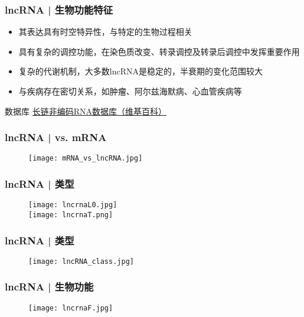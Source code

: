 \begin{frame}
  \frametitle{lncRNA | 生物功能特征}
  \begin{itemize}
    \item 其表达具有时空特异性，与特定的生物过程相关
    \item 具有复杂的调控功能，在染色质改变、转录调控及转录后调控中发挥重要作用
    \item 复杂的代谢机制，大多数lncRNA是稳定的，半衰期的变化范围较大
    \item 与疾病存在密切关系，如肿瘤、阿尔兹海默病、心血管疾病等
  \end{itemize}
  \pause
  \begin{block}{数据库}
    \href{http://zh.wikipedia.org/wiki/\%E9\%95\%BF\%E9\%93\%BE\%E9\%9D\%9E\%E7\%BC\%96\%E7\%A0\%81RNA\%E6\%95\%B0\%E6\%8D\%AE\%E5\%BA\%93}{长链非编码RNA数据库（维基百科）}
  \end{block}
\end{frame}

\begin{frame}
  \frametitle{lncRNA | vs. mRNA}
  \vspace{-0.8em}
  \begin{figure}
    \centering
    \texttt{[image: mRNA\_vs\_lncRNA.jpg]}
  \end{figure}
\end{frame}

\begin{frame}
  \frametitle{lncRNA | 类型}
  \begin{figure}
    \centering
    \texttt{[image: lncrnaL0.jpg]}\\
    \texttt{[image: lncrnaT.png]}
  \end{figure}
\end{frame}

\begin{frame}
  \frametitle{lncRNA | 类型}
  \begin{figure}
    \centering
    \texttt{[image: lncRNA\_class.jpg]}
  \end{figure}
\end{frame}

\begin{frame}
  \frametitle{lncRNA | 生物功能}
  \begin{figure}
    \centering
    \texttt{[image: lncrnaF.jpg]}
  \end{figure}
\end{frame}

